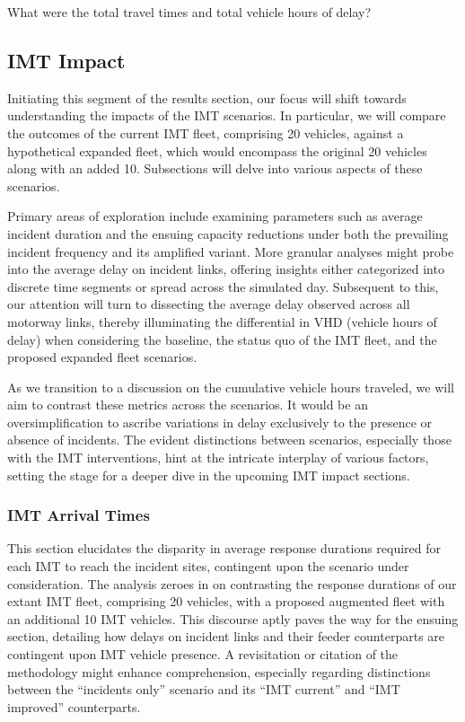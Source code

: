 \documentclass[
  letterpaper,
  authoryear]{elsarticle}
\begin{document}
What were the total travel times and total vehicle hours of delay?

\hypertarget{imt-impact}{%
\subsection{IMT Impact}\label{imt-impact}}

Initiating this segment of the results section, our focus will shift
towards understanding the impacts of the IMT scenarios. In particular,
we will compare the outcomes of the current IMT fleet, comprising 20
vehicles, against a hypothetical expanded fleet, which would encompass
the original 20 vehicles along with an added 10. Subsections will delve
into various aspects of these scenarios.

Primary areas of exploration include examining parameters such as
average incident duration and the ensuing capacity reductions under both
the prevailing incident frequency and its amplified variant. More
granular analyses might probe into the average delay on incident links,
offering insights either categorized into discrete time segments or
spread across the simulated day. Subsequent to this, our attention will
turn to dissecting the average delay observed across all motorway links,
thereby illuminating the differential in VHD (vehicle hours of delay)
when considering the baseline, the status quo of the IMT fleet, and the
proposed expanded fleet scenarios.

As we transition to a discussion on the cumulative vehicle hours
traveled, we will aim to contrast these metrics across the scenarios. It
would be an oversimplification to ascribe variations in delay
exclusively to the presence or absence of incidents. The evident
distinctions between scenarios, especially those with the IMT
interventions, hint at the intricate interplay of various factors,
setting the stage for a deeper dive in the upcoming IMT impact sections.

\hypertarget{imt-arrival-times}{%
\subsubsection{IMT Arrival Times}\label{imt-arrival-times}}

This section elucidates the disparity in average response durations
required for each IMT to reach the incident sites, contingent upon the
scenario under consideration. The analysis zeroes in on contrasting the
response durations of our extant IMT fleet, comprising 20 vehicles, with
a proposed augmented fleet with an additional 10 IMT vehicles. This
discourse aptly paves the way for the ensuing section, detailing how
delays on incident links and their feeder counterparts are contingent
upon IMT vehicle presence. A revisitation or citation of the methodology
might enhance comprehension, especially regarding distinctions between
the ``incidents only'' scenario and its ``IMT current'' and ``IMT
improved'' counterparts.
\end{document}

